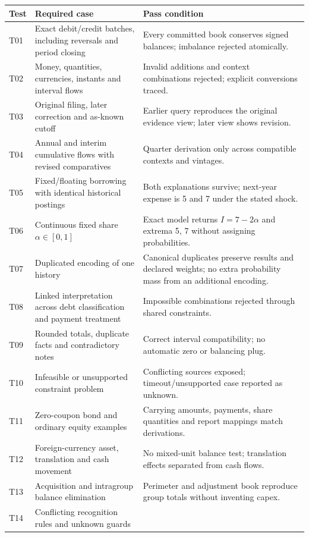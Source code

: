 \begin{longtable}{L{16mm}L{73mm}L{47mm}}
\toprule Test & Required case & Pass condition\\\midrule\endhead
T01 & Exact debit/credit batches, including reversals and period closing &
Every committed book conserves signed balances; imbalance rejected atomically.\\
T02 & Money, quantities, currencies, instants and interval flows &
Invalid additions and context combinations rejected; explicit conversions traced.\\
T03 & Original filing, later correction and as-known cutoff &
Earlier query reproduces the original evidence view; later view shows revision.\\
T04 & Annual and interim cumulative flows with revised comparatives &
Quarter derivation only across compatible contexts and vintages.\\
T05 & Fixed/floating borrowing with identical historical postings &
Both explanations survive; next-year expense is 5 and 7 under the stated shock.\\
T06 & Continuous fixed share $\alpha\in[0,1]$ &
Exact model returns $I=7-2\alpha$ and extrema 5, 7 without assigning probabilities.\\
T07 & Duplicated encoding of one history &
Canonical duplicates preserve results and declared weights; no extra
probability mass from an additional encoding.\\
T08 & Linked interpretation across debt classification and payment treatment &
Impossible combinations rejected through shared constraints.\\
T09 & Rounded totals, duplicate facts and contradictory notes &
Correct interval compatibility; no automatic zero or balancing plug.\\
T10 & Infeasible or unsupported constraint problem &
Conflicting sources exposed; timeout/unsupported case reported as unknown.\\
T11 & Zero-coupon bond and ordinary equity examples &
Carrying amounts, payments, share quantities and report mappings match derivations.\\
T12 & Foreign-currency asset, translation and cash movement &
No mixed-unit balance test; translation effects separated from cash flows.\\
T13 & Acquisition and intragroup balance elimination &
Perimeter and adjustment book reproduce group totals without inventing capex.\\
T14 & Conflicting recognition rules and unknown guards &

\end{longtable}
